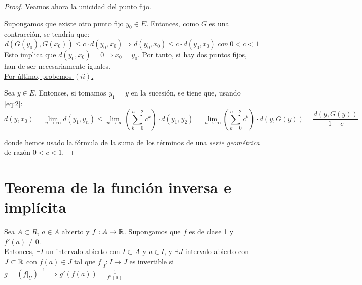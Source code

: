 \begin{proof}
\underline{Veamos ahora la unicidad del punto fijo.}

\vspace{0.5em}
Supongamos que existe otro punto fijo $y_0 \in E$. Entonces, como $G$ es una contracción, se tendría que:
$$d(G(y_0),G(x_{0})) \le c\cdot d(y_0, x_0) \Rightarrow d(y_0, x_0) \le c \cdot d(y_0, x_0)\ con\ 0 < c < 1$$ Esto implica que $d(y_0,x_0) = 0 \Rightarrow x_0 = y_0$. Por tanto, si hay dos puntos fijos, han de ser necesariamente iguales.\\

\underline{Por último, probemos $(ii)$.}

Sea $y \in E$. Entonces, si tomamos $y_1$ = $y$ en la sucesión, se tiene que, usando \eqref{eq:2}: $$d(y,x_0) = \lim_{n\rightarrow \infty}d(y_1,y_n) \le \lim_{n\rightarrow \infty}\left(\sum_{k=0}^{n-2} c^k\right)\cdot d(y_1, y_2)= \lim_{n\rightarrow \infty}\left(\sum_{k=0}^{n-2} c^k\right)\cdot d(y, G(y)) = \frac{d(y, G(y))}{1-c} $$

donde hemos usado la fórmula de la suma de los términos de una \textit{serie geométrica} de razón $0 < c < 1$.
\end{proof}

\section{Teorema de la función inversa e implícita}
\begin{nth}[Teorema de la función inversa. Caso N=1]
	Sea $A\subset R$, $a \in A$ abierto y $f:A \to \mathbb{R}$. Supongamos que $f$ es de clase 1 y $f'(a) \ne 0$.\\
	 Entonces, $\exists I $ un intervalo abierto con $I \subset A$ y $a \in I$, y $\exists J$ intervalo abierto con $J\subset \mathbb{R}$ con $f(a) \in J$ tal que $f|_I: I \to J$ es invertible si $g = (f|_U)^{-1} \implies g'(f(a)) = \frac{1}{f'(a)}$
\end{nth}

